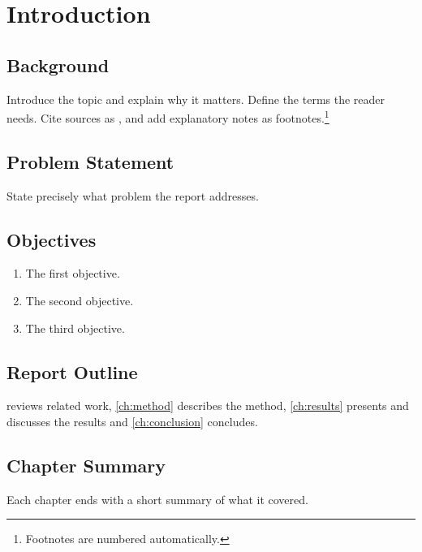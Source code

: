 \chapter{Introduction}

\section{Background}
Introduce the topic and explain why it matters. Define the terms the reader needs. Cite sources as
\cite{knuth1984}, and add explanatory notes as footnotes.\footnote{Footnotes are numbered automatically.}

\section{Problem Statement}
State precisely what problem the report addresses.

\section{Objectives}
\begin{enumerate}
  \item The first objective.
  \item The second objective.
  \item The third objective.
\end{enumerate}

\section{Report Outline}
 reviews related work, \cref{ch:method} describes the method, \cref{ch:results}
presents and discusses the results and \cref{ch:conclusion} concludes.

\section{Chapter Summary}
Each chapter ends with a short summary of what it covered.
